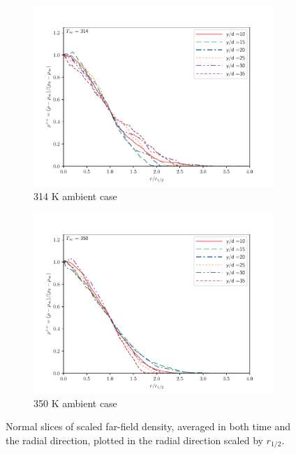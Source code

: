 \begin{figure}[H]
\begin{center}
\begin{subfigure}{0.45\textwidth}
	\includegraphics[scale=.45]{figures/Plots/radial/slices_5/314_ambient/r_vs_rho.pdf}
	\caption{314 K ambient case} \label{noniso_r_vs_rho_1}
\end{subfigure}
\begin{subfigure}{0.45\textwidth}
	\includegraphics[scale=.45]{figures/Plots/radial/slices_5/350_ambient/r_vs_rho.pdf}
	\caption{350 K ambient case} \label{noniso_r_vs_rho_2}
\end{subfigure}
\caption{Normal slices of scaled far-field density, averaged in both time and the radial direction, plotted in the radial direction scaled by $r_{1/2}$.}
\label{noniso_far_r_rho_features}
\end{center}
\end{figure}

